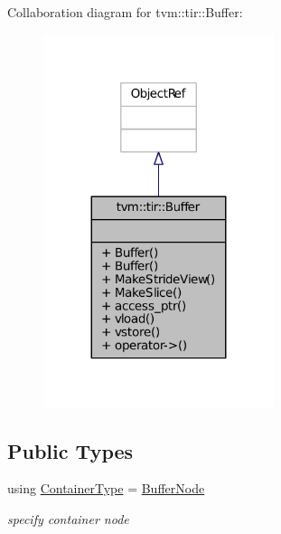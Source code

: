 Collaboration diagram for tvm\+:\+:tir\+:\+:Buffer\+:
\nopagebreak
\begin{figure}[H]
\begin{center}
\leavevmode
\includegraphics[width=191pt]{classtvm_1_1tir_1_1Buffer__coll__graph}
\end{center}
\end{figure}
\subsection*{Public Types}
\begin{DoxyCompactItemize}
\item 
using \hyperlink{classtvm_1_1tir_1_1Buffer_aba3e2da6a30d5495fb89307b8db2926a}{Container\+Type} = \hyperlink{classtvm_1_1tir_1_1BufferNode}{Buffer\+Node}
\begin{DoxyCompactList}\small\item\em specify container node \end{DoxyCompactList}\end{DoxyCompactItemize}
